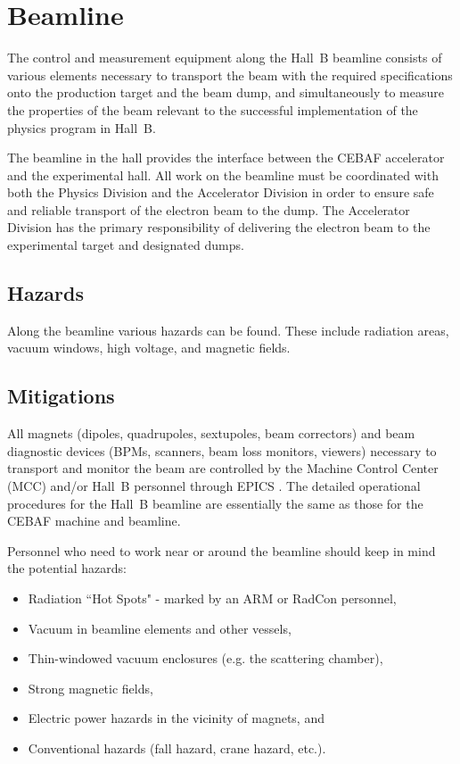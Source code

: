\section{Beamline}

The control and measurement equipment along the Hall~B beamline consists of various 
elements necessary to transport the beam with the required specifications onto the 
production target and the beam dump, and simultaneously to measure the properties of 
the beam relevant to the successful implementation of the physics program in Hall~B. 

The beamline in the hall provides the interface between the CEBAF accelerator and the 
experimental hall. All work on the beamline must be coordinated with both the Physics 
Division and the Accelerator Division in order to ensure safe and reliable transport of 
the electron beam to the dump. The Accelerator Division has the primary responsibility 
of delivering the electron beam to the experimental target and designated dumps.

\subsection{Hazards} 

Along the beamline various hazards can be found. These include radiation areas, vacuum 
windows, high voltage, and magnetic fields.

\subsection{Mitigations}

All magnets (dipoles, quadrupoles, sextupoles, beam correctors) and beam diagnostic devices 
(BPMs, scanners, beam loss monitors, viewers) necessary to transport and monitor the beam 
are controlled by the Machine Control Center (MCC) and/or Hall~B personnel through EPICS 
\cite{epics}. The detailed operational procedures for the Hall~B beamline are essentially 
the same as those for the CEBAF machine and beamline.

Personnel who need to work near or around the beamline should keep in mind the potential 
hazards:
\begin{itemize}
\item Radiation ``Hot Spots" - marked by an ARM or RadCon personnel,
\item Vacuum in beamline elements and other vessels,
\item Thin-windowed vacuum enclosures (e.g. the scattering chamber),
\item Strong magnetic fields,
\item Electric power hazards in the vicinity of magnets, and 
\item Conventional hazards (fall hazard, crane hazard, etc.). 
\end{itemize} 

